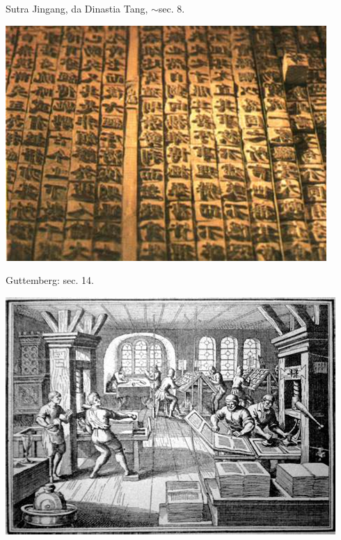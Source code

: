 \begin{multicols}{2}
	
	Sutra Jingang, da Dinastia Tang, $\sim$sec. 8.

	\begin{center}
		\includegraphics[width=\linewidth]{./IMG/download.png}
	\end{center}

\vfill
\columnbreak
Guttemberg: sec. 14.
	\begin{center}
		\includegraphics[width=\linewidth]{./IMG/th-620000562.jpg}
	\end{center}

\vfill
\columnbreak


\end{multicols}
